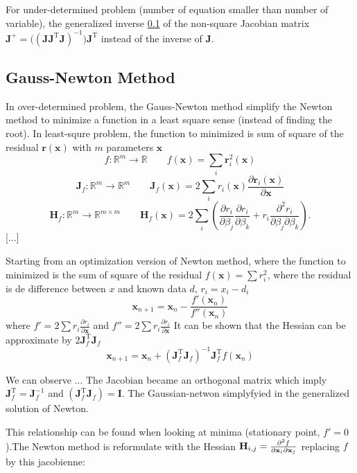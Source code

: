 \documentclass[twocolumn]{article}
\numberwithin{equation}{section}
\begin{document}
For under-determined problem (number of equation smaller than number of variable), the generalized inverse \ref{} of the non-square Jacobian matrix $\mathbf{J^+ = (( J J^\mathrm{T} J)}^{-1}) \mathbf{J^\mathrm{T}}$ instead of the inverse of $\mathbf J$.

	\subsection{Gauss-Newton Method}
In over-determined problem, the Gauss-Newton method simplify the Newton method to minimize a function in a least square sense (instead of finding the root). 
In least-squre problem, the function to minimized is sum of square of the residual $\mathbf{r}(\mathbf{x})$ with $m$ parameters $\mathbf{x}$
$$f\colon \mathbb{R}^m \rightarrow \mathbb{R} \qquad f(\mathbf{x})=\sum_i \mathbf{r}_i^2(\mathbf{x})$$
$$\mathbf{J}_f\colon \mathbb{R}^m \rightarrow \mathbb{R}^m \qquad \mathbf{J}_f(\mathbf{x})=2\sum_i r_i(\mathbf{x}) \frac{\partial \mathbf{r}_i(\mathbf{x})}{\partial \mathbf{x}}$$
$$\mathbf{H}_f\colon \mathbb{R}^m \rightarrow \mathbb{R}^{m\times m} \qquad \mathbf{H}_f(\mathbf{x})=2\sum_{i} \left(\frac{\partial r_i}{\partial \beta_j}\frac{\partial r_i}{\partial \beta_k}+r_i\frac{\partial^2 r_i}{\partial \beta_j \partial \beta_k} \right).$$
[...]

Starting from an optimization version of Newton method, where the function to minimized is the sum of square of the residual $f(\mathbf{x})=\sum r_i^2$, where the residual is de difference between $x$ and known data $d$, $r_i=x_i-d_i$
$$\mathbf{x}_{n+1} = \mathbf{x}_n - \frac{f'(\mathbf{x}_n)}{f''(\mathbf{x}_n)} $$
where $f' = 2 \sum r_i \frac{\partial r_i}{\partial \mathbf{x}}$ and $f'' = 2 \sum r_i \frac{\partial r_i}{\partial \mathbf{x}}$
It can be shown that the Hessian can be approximate by $2\mathbf{J}_f^\mathrm{T}\mathbf{J}_f$
$$ \mathbf{x}_{n+1} = \mathbf{x}_n  +  (\mathbf{J}_f^\mathrm{T}\mathbf{J}_f)^{-1}\mathbf{J}_f^\mathrm{T} f(\mathbf{x}_n)$$


We can observe ... The Jacobian became an orthogonal matrix which imply $\mathbf{J}_f^\mathrm{T}=\mathbf{J}_f^{-1}$ and $(\mathbf{J}_f^\mathrm{T}\mathbf{J}_f) =\mathbf I$. The Gaussian-netwon simplyfyied in the generalized solution of Newton.

This relationship can be found when looking at minima (stationary point, $f'=0$).The Newton method is reformulate with the Hessian $\bold H_{i,j} = \frac{\partial^2 f}{\partial \mathbf x_i \partial \mathbf x_j}$ replacing $f$ by this jacobienne:
\end{document}
